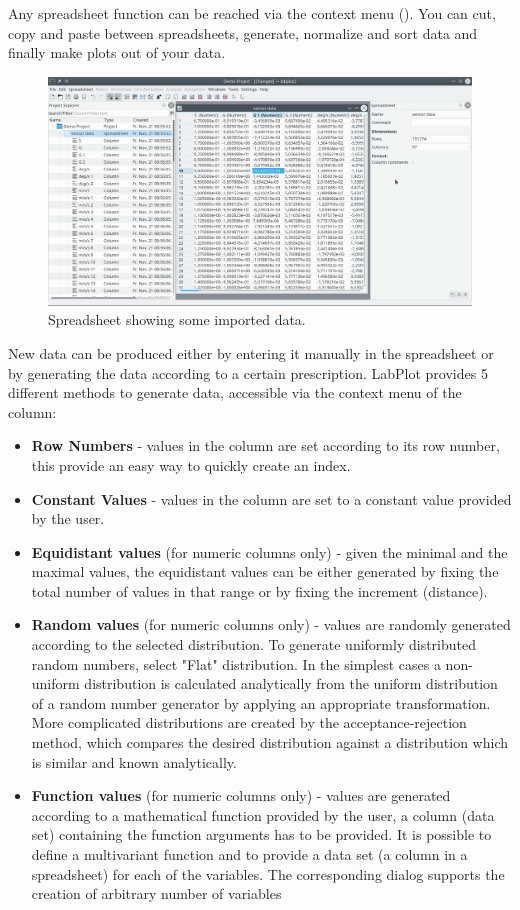 Any spreadsheet function can be reached via the context menu (\rmb).
You can cut, copy and paste between spreadsheets, generate, normalize and sort data and finally make plots out of your data.
\begin{figure}
\includegraphics[width=\textwidth]{images/spreadsheet.png}
\caption{Spreadsheet showing some imported data.}
\end{figure}

New data can be produced either by entering it manually in the spreadsheet or by generating the data according to a certain prescription.
LabPlot provides 5 different methods to generate data, accessible via the context menu of the column:
\begin{itemize}
\item \textbf{Row Numbers} - values in the column are set according to its row number, this provide an easy way to quickly create an index.
%
\item \textbf{Constant Values} - values in the column are set to a constant value provided by the user.
%
\item \textbf{Equidistant values} (for numeric columns only) - given the minimal and the maximal values, the equidistant values can be either generated 
by fixing the total number of values in that range or by fixing the increment (distance).
%
\item \textbf{Random values} (for numeric columns only) - values are randomly generated according to the selected distribution.
To generate uniformly distributed random numbers, select "Flat" distribution.
In the simplest cases a non-uniform distribution is calculated analytically from the uniform distribution of a random number generator by applying
an appropriate transformation. More complicated distributions are created by the acceptance-rejection method, which compares the desired distribution
against a distribution which is similar and known analytically.
%
\item \textbf{Function values} (for numeric columns only) - values are generated according to a mathematical function provided by the user, 
a column (data set) containing the function arguments has to be provided.
It is possible to define a multivariant function and to provide a data set (a column in a spreadsheet) for each of the variables.
The corresponding dialog supports the creation of arbitrary number of variables
\end{itemize}

